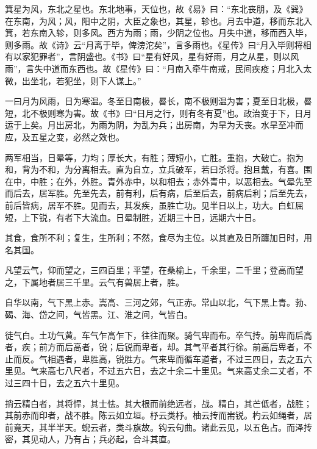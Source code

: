 \documentclass[12pt,UTF8]{ctexbook}
\begin{document}
箕星为风，东北之星也。东北地事，天位也，故《易》曰：“东北丧朋，及《巽》在东南，为风；风，阳中之阴，大臣之象也，其星，轸也。月去中道，移而东北入箕，若东南入轸，则多风。西方为雨；雨，少阴之位也。月失中道，移而西入毕，则多雨。故《诗》云“月离于毕，俾滂沱矣”，言多雨也。《星传》曰“月入毕则将相有以家犯罪者”，言阴盛也。《书》曰“星有好风，星有好雨，月之从星，则以风雨”，言失中道而东西也。故《星传》曰：“月南入牵牛南戒，民间疾疫；月北入太微，出坐北，若犯坐，则下人谋上。”



一曰月为风雨，日为寒温。冬至日南极，晷长，南不极则温为害；夏至日北极，晷短，北不极则寒为害。故《书》曰“日月之行，则有冬有夏”也。政治变于下，日月运于上矣。月出房北，为雨为阴，为乱为兵；出房南，为旱为夭丧。水旱至冲而应，及五星之变，必然之效也。



两军相当，日晕等，力均；厚长大，有胜；薄短小，亡胜。重抱，大破亡。抱为和，背为不和，为分离相去。直为自立，立兵破军，若曰杀将。抱且戴，有喜。围在中，中胜；在外，外胜。青外赤中，以和相去；赤外青中，以恶相去。气晕先至而后去，居军胜。先至先去，前有利，后有病，后至后去，前病后利；后至先去，前后皆病，居军不胜。见而去，其发疾，虽胜亡功。见半日以上，功大。白虹屈短，上下锐，有者下大流血。日晕制胜，近期三十日，远期六十日。



其食，食所不利；复生，生所利；不然，食尽为主位。以其直及日所躔加日时，用名其国。



凡望云气，仰而望之，三四百里；平望，在桑榆上，千余里，二千里；登高而望之，下属地者居三千里。云气有兽居上者，胜。



自华以南，气下黑上赤。嵩高、三河之郊，气正赤。常山以北，气下黑上青。勃、碣、海、岱之间，气皆黑。江、淮之间，气皆白。



徒气白。土功气黄。车气乍高乍下，往往而聚。骑气卑而布。卒气抟。前卑而后高者，疾；前方而后高者，锐；后锐而卑者，却。其气平者其行徐。前高后卑者，不止而反。气相遇者，卑胜高，锐胜方。气来卑而循车道者，不过三四日，去之五六里见。气来高七八尺者，不过五六日，去之十余二十里见。气来高丈余二丈者，不过三四十日，去之五六十里见。



捎云精白者，其将悍，其士怯。其大根而前绝远者，战。精白，其芒低者，战胜；其前赤而印者，战不胜。陈云如立垣。杼云类杼。柚云抟而耑锐。杓云如绳者，居前竟天，其半半天。蜺云者，类斗旗故。钩云句曲。诸此云见，以五色占。而泽抟密，其见动人，乃有占；兵必起，合斗其直。
\end{document}
